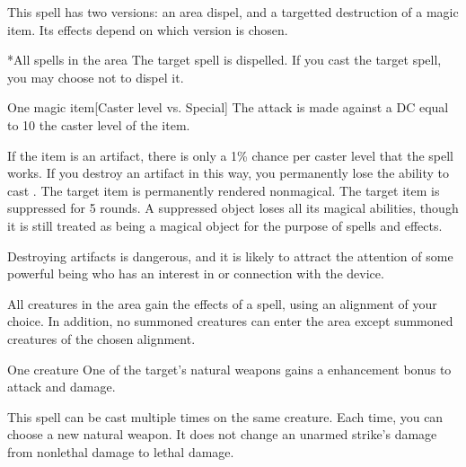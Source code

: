 \spellspecial This spell has two versions: an area dispel, and a targetted destruction of a magic item. Its effects depend on which version is chosen.
\spellline
{}
\begin{spelltargets}*{All spells in the area}
    \spelleffect The target spell is dispelled. If you cast the target spell, you may choose not to dispel it.
\end{spelltargets}
\begin{spelltarget}{One magic item}[Caster level vs. Special]
    \spellspecial The attack is made against a DC equal to 10 \add the caster level of the item.

    If the item is an artifact, there is only a 1\% chance per caster level that the spell works. If you destroy an artifact in this way, you permanently lose the ability to cast .
    \spellsuccess The target item is permanently rendered nonmagical.
    \spellfailure The target item is suppressed for 5 rounds. A suppressed object loses all its magical abilities, though it is still treated as being a magical object for the purpose of spells and effects.
\end{spelltarget}
\spellnotes Destroying artifacts is dangerous, and it is likely to attract the attention of some powerful being who has an interest in or connection with the device.

\spelldur{\durshort \dismissable}
\spelleffect All creatures in the area gain the effects of a  spell, using an alignment of your choice. In addition, no summoned creatures can enter the area except summoned creatures of the chosen alignment.

\spellrng{\rngclose}
\spelldur{\durshort}
\begin{spelltarget}{One creature}
    \spelleffect One of the target's natural weapons gains a  enhancement bonus to attack and damage. \spellbonusscalingdescription
\end{spelltarget}
\spellnotes This spell can be cast multiple times on the same creature. Each time, you can choose a new natural weapon. It does not change an unarmed strike's damage from nonlethal damage to lethal damage.

